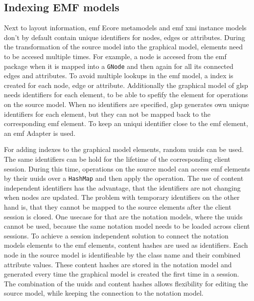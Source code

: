 \documentclass[conference,onecolumn]{IEEEtran}
\newcommand{\code}[1]{\texttt{#1}}
\begin{document}
  \subsection{Indexing EMF models}
  \label{subsec:indexing}

  Next to layout information, \ac{emf} Ecore metamodels and \ac{emf} \ac{xmi} instance models don't by default contain unique identifiers for nodes, edges or attributes. \cite{emf,emf-repo} 
  During the transformation of the source model into the graphical model, elements need to be accesed multiple times. For example, a node is accesed from the \ac{emf} package when it is mapped into a \code{GNode} and then again for all its connected edges and attributes. To avoid multiple lookups in the \ac{emf} model, a index is created for each node, edge or attribute. Additionally the graphical model of \ac{glsp} needs identifiers for each element, to be able to spefify the element for operations on the source model. When no identifiers are specified, \ac{glsp} generates own unique identifiers for each element, but they can not be mapped back to the corresponding \ac{emf} element. To keep an uniqui identifier close to the \ac{emf} element, an \ac{emf} Adapter is used. 

  For adding indexes to the graphical model elements, random \acp{uuid} can be used. The same identifiers can be hold for the lifetime of the corresponding client session. During this time, operations on the source model can access \ac{emf} elements by their \acp{uuid} over a \code{HashMap} and then apply the operation. The use of content independent identifiers has the advantage, that the identifiers are not changing when nodes are updated. The problem with temporary identifiers on the other hand is, that they cannot be mapped to the source elements after the client session is closed. One usecase for that are the  notation models, where the \acp{uuid} cannot be used, because the same notation model needs to be loaded across client sessions. To achieve a session independent solution to connect the notation models elements to the \ac{emf} elements, content hashes are used as identifiers. Each node in the source model is identifieable by the class name and their combined attribute values. These content hashes are stored in the notation model and generated every time the graphical model is created the first time in a session. The combination of the \acp{uuid} and content hashes allows flexibility for editing the source model, while keeping the connection to the notation model.
\end{document}
